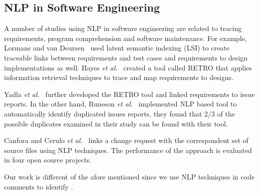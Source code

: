 \subsection{NLP in Software Engineering}

A number of studies using NLP in software engineering are related to tracing requirements, program comprehension and software maintenance. 
For example, Lormans and van Deursen~\cite{Lormans2006CSRM} used latent semantic indexing (LSI) to create traceable links between requirements and test cases and requirements to design implementations as well. Hayes \textit{et al.}~\cite{Hayes2005, Hayes2006TSE} created a tool called RETRO that applies information retrieval techniques to trace and map requirements to designs. 

Yadla \textit{et al.}~\cite{yadla2005tracing} further developed the RETRO tool and linked requirements to issue reports. In the other hand, Runeson \textit{et al.}~\cite{Runeson2007ICSE} implemented NLP based tool to automatically identify duplicated issues reports, they found that 2/3 of the possible duplicates examined in their study can be found with their tool. 

Canfora and Cerulo \textit{et al.}~\cite{Canfora2005ISSM} links a change request with the correspondent set of source files using NLP techniques. The performance of the approach is evaluated in four open source projects.  

Our work is different of the afore mentioned since we use NLP techniques in code comments to identify \SATD.





